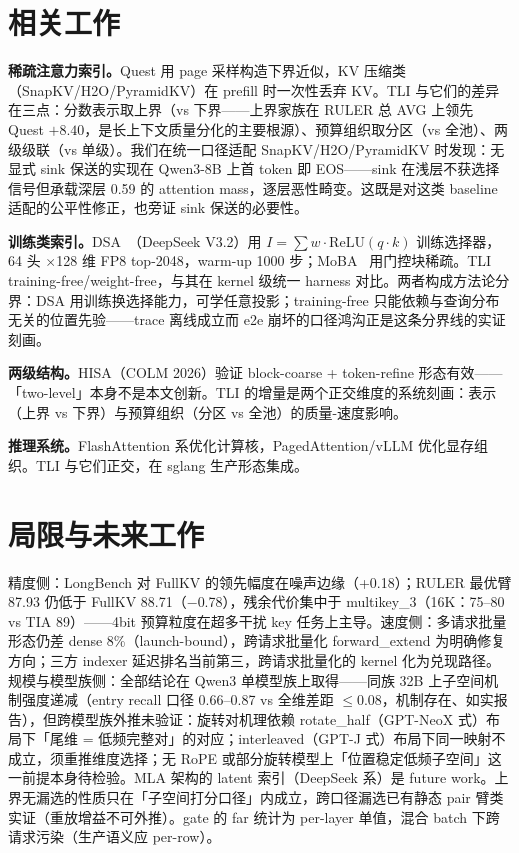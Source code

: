 \documentclass[11pt]{article}
\begin{document}
\section{相关工作}

\textbf{稀疏注意力索引。}Quest 用 page 采样构造下界近似，KV 压缩类（SnapKV/H2O/PyramidKV）在 prefill 时一次性丢弃 KV。TLI 与它们的差异在三点：分数表示取上界（vs 下界——上界家族在 RULER 总 AVG 上领先 Quest $+8.40$，是长上下文质量分化的主要根源）、预算组织取分区（vs 全池）、两级级联（vs 单级）。我们在统一口径适配 SnapKV/H2O/PyramidKV 时发现：无显式 sink 保送的实现在 Qwen3-8B 上首 token 即 EOS——sink 在浅层不获选择信号但承载深层 0.59 的 attention mass，逐层恶性畸变。这既是对这类 baseline 适配的公平性修正，也旁证 sink 保送的必要性。

\textbf{训练类索引。}DSA~\cite{dsa}（DeepSeek V3.2）用 $I=\sum w\cdot\mathrm{ReLU}(q\cdot k)$ 训练选择器，64 头 $\times$128 维 FP8 top-2048，warm-up 1000 步；MoBA~\cite{moba} 用门控块稀疏。TLI training-free/weight-free，与其在 kernel 级统一 harness 对比。两者构成方法论分界：DSA 用训练换选择能力，可学任意投影；training-free 只能依赖与查询分布无关的位置先验——trace 离线成立而 e2e 崩坏的口径鸿沟正是这条分界线的实证刻画。

\textbf{两级结构。}HISA（COLM 2026）验证 block-coarse + token-refine 形态有效——「two-level」本身不是本文创新。TLI 的增量是两个正交维度的系统刻画：表示（上界 vs 下界）与预算组织（分区 vs 全池）的质量-速度影响。

\textbf{推理系统。}FlashAttention 系优化计算核，PagedAttention/vLLM 优化显存组织。TLI 与它们正交，在 sglang 生产形态集成。

\section{局限与未来工作}

精度侧：LongBench 对 FullKV 的领先幅度在噪声边缘（+0.18）；RULER 最优臂 87.93 仍低于 FullKV 88.71（$-$0.78），残余代价集中于 multikey\_3（16K：75--80 vs TIA 89）——4bit 预算粒度在超多干扰 key 任务上主导。速度侧：多请求批量形态仍差 dense 8\%（launch-bound），跨请求批量化 forward\_extend 为明确修复方向；三方 indexer 延迟排名当前第三，跨请求批量化的 kernel 化为兑现路径。规模与模型族侧：全部结论在 Qwen3 单模型族上取得——同族 32B 上子空间机制强度递减（entry recall 口径 0.66--0.87 vs 全维差距 $\le$0.08，机制存在、如实报告），但跨模型族外推未验证：旋转对机理依赖 rotate\_half（GPT-NeoX 式）布局下「尾维 = 低频完整对」的对应；interleaved（GPT-J 式）布局下同一映射不成立，须重推维度选择；无 RoPE 或部分旋转模型上「位置稳定低频子空间」这一前提本身待检验。MLA 架构的 latent 索引（DeepSeek 系）是 future work。上界无漏选的性质只在「子空间打分口径」内成立，跨口径漏选已有静态 pair 臂类实证（重放增益不可外推）。gate 的 far 统计为 per-layer 单值，混合 batch 下跨请求污染（生产语义应 per-row）。
\end{document}
